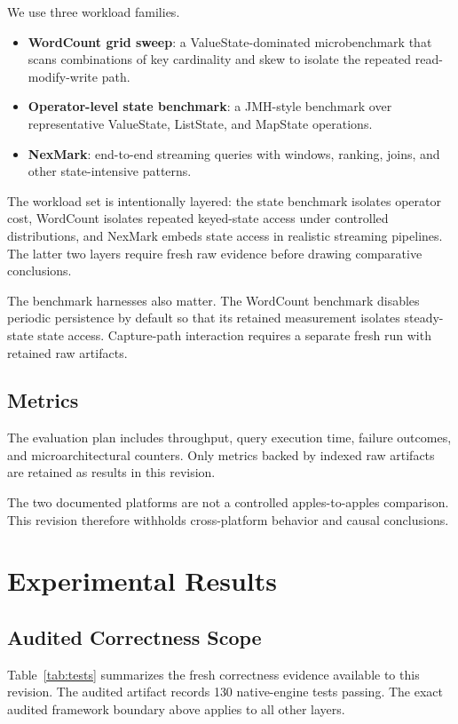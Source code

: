 \documentclass[journal]{IEEEtran}
\begin{document}
We use three workload families.
\begin{itemize}
\item \textbf{WordCount grid sweep}: a ValueState-dominated microbenchmark that scans combinations of key cardinality and skew to isolate the repeated read-modify-write path.
\item \textbf{Operator-level state benchmark}: a JMH-style benchmark over representative ValueState, ListState, and MapState operations.
\item \textbf{NexMark}: end-to-end streaming queries with windows, ranking, joins, and other state-intensive patterns.
\end{itemize}

The workload set is intentionally layered: the state benchmark isolates operator cost, WordCount isolates repeated keyed-state access under controlled distributions, and NexMark embeds state access in realistic streaming pipelines. The latter two layers require fresh raw evidence before drawing comparative conclusions.

The benchmark harnesses also matter. The WordCount benchmark disables periodic persistence by default so that its retained measurement isolates steady-state state access. Capture-path interaction requires a separate fresh run with retained raw artifacts.

\subsection{Metrics}

The evaluation plan includes throughput, query execution time, failure outcomes, and microarchitectural counters. Only metrics backed by indexed raw artifacts are retained as results in this revision.

The two documented platforms are not a controlled apples-to-apples comparison. This revision therefore withholds cross-platform behavior and causal conclusions.

\section{Experimental Results}

\subsection{Audited Correctness Scope}

Table~\ref{tab:tests} summarizes the fresh correctness evidence available to this revision. The audited artifact records 130 native-engine tests passing. The exact audited framework boundary above applies to all other layers.
\end{document}
